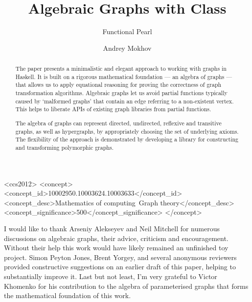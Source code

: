 \documentclass[sigplan]{acmart}
\begin{document}
\title{Algebraic Graphs with Class\vspace{-1mm}}
\subtitle{Functional Pearl}

\author{Andrey Mokhov}

\begin{abstract}
The paper presents a minimalistic and elegant approach to working
with graphs in Haskell. It is built on a rigorous
mathematical foundation --- an algebra of graphs --- that allows us to apply
equational reasoning for proving the correctness of graph transformation
algorithms. Algebraic graphs let us avoid partial functions typically
caused by `malformed graphs' that contain an edge referring to
a non-existent vertex. This helps to liberate APIs of existing graph libraries
from partial functions.

The algebra of graphs can represent directed, undirected, reflexive
and transitive graphs, as well as hypergraphs, by appropriately choosing
the set of underlying axioms. The flexibility of the approach is
demonstrated by developing a library for constructing
and transforming polymorphic graphs.
\end{abstract}

\begin{CCSXML}
<ccs2012>
<concept>
<concept_id>10002950.10003624.10003633</concept_id>
<concept_desc>Mathematics of computing~Graph theory</concept_desc>
<concept_significance>500</concept_significance>
</concept>
\end{CCSXML}


\maketitle









\begin{acks}
  I would like to thank Arseniy Alekseyev and Neil Mitchell
  for numerous discussions on algebraic graphs, their advice,
  criticism and encouragement. Without their help this work would
  have likely remained an unfinished toy project.
  Simon Peyton Jones, Brent Yorgey, and several anonymous reviewers
  provided constructive suggestions on an earlier draft of this paper,
  helping to substantially improve it. Last but not least, I'm very
  grateful to Victor Khomenko for his contribution to the algebra of
  parameterised graphs that forms the mathematical foundation of this work.
\end{acks}


\end{document}
